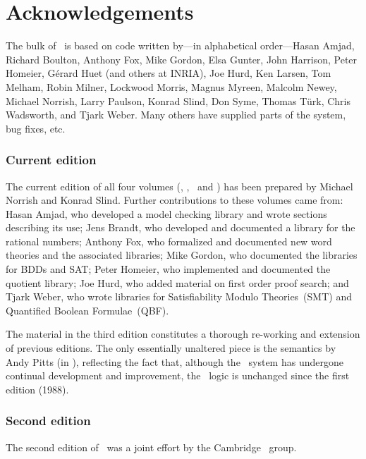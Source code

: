 \chapter*{Acknowledgements}

The bulk of \HOL\ is based on code written by---in alphabetical
order---Hasan Amjad, Richard Boulton, Anthony Fox, Mike Gordon, Elsa
Gunter, John Harrison, Peter Homeier, G\'erard Huet (and others at
INRIA), Joe Hurd, Ken Larsen, Tom Melham, Robin Milner, Lockwood
Morris, Magnus Myreen, Malcolm Newey, Michael Norrish, Larry Paulson,
Konrad Slind, Don Syme, Thomas T\"urk, Chris Wadsworth, and Tjark
Weber.  Many others have supplied parts of the system, bug fixes, etc.

\subsection*{Current edition}

The current edition of all four volumes (\LOGIC, \TUTORIAL,
\DESCRIPTION\ and \REFERENCE) has been prepared by Michael Norrish and
Konrad Slind. Further contributions to these volumes came from: Hasan
Amjad, who developed a model checking library and wrote sections
describing its use; Jens Brandt, who developed and documented a
library for the rational numbers; Anthony Fox, who formalized and
documented new word theories and the associated libraries; Mike
Gordon, who documented the libraries for BDDs and SAT; Peter Homeier,
who implemented and documented the quotient library; Joe Hurd, who
added material on first order proof search; and Tjark Weber, who wrote
libraries for Satisfiability Modulo Theories~(SMT) and Quantified
Boolean Formulae~(QBF).

\medskip

The material in the third edition constitutes a thorough re-working
and extension of previous editions.  The only essentially unaltered
piece is the semantics by Andy Pitts (in \LOGIC), reflecting the fact
that, although the \HOL\ system has undergone continual development
and improvement, the \HOL\ logic is unchanged since the first edition
(1988).

\newpage

\subsection*{Second edition}

The second edition of \REFERENCE\ was a joint effort by the Cambridge
\HOL\ group.


